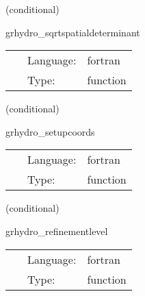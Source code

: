 \documentclass{article}
\begin{document}
\vspace{5mm}

   (conditional) 

\hspace{5mm} grhydro\_sqrtspatialdeterminant 

\hspace{5mm}{\it calculate sdetg } 


\hspace{5mm}

 \begin{tabular*}{160mm}{cll} 
~ & Language:  & fortran \\ 
~ & Type:  & function \\ 
\end{tabular*} 


\vspace{5mm}

   (conditional) 

\hspace{5mm} grhydro\_setupcoords 

\hspace{5mm}{\it set up the coordinates for use with the comoving shift } 


\hspace{5mm}

 \begin{tabular*}{160mm}{cll} 
~ & Language:  & fortran \\ 
~ & Type:  & function \\ 
\end{tabular*} 


\vspace{5mm}

   (conditional) 

\hspace{5mm} grhydro\_refinementlevel 

\hspace{5mm}{\it calculate current refinement level (for the check of the c2p mask) } 


\hspace{5mm}

 \begin{tabular*}{160mm}{cll} 
~ & Language:  & fortran \\ 
~ & Type:  & function \\ 
\end{tabular*} 


\vspace{5mm}
\end{document}
